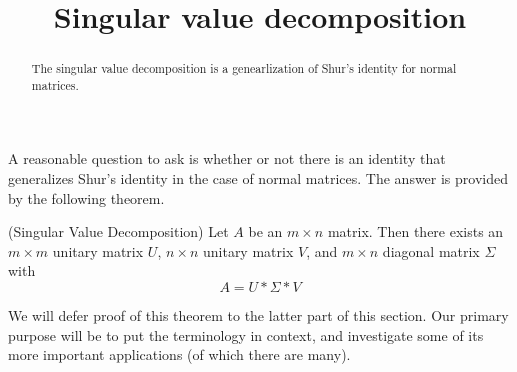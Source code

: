 \documentclass{ximera}
\title{Singular value decomposition}
\begin{document}
\begin{abstract}
  The singular value decomposition is a genearlization of Shur's
  identity for normal matrices.
\end{abstract}

A reasonable question to ask is whether or not there is an identity that generalizes Shur's identity in the case of normal matrices. The answer is provided by the following theorem.

\begin{theorem} (Singular Value Decomposition) Let $A$ be an $m\times n$ matrix. Then there exists an $m\times m$ unitary matrix $U$, $n\times n$ unitary matrix $V$, and $m\times n$ diagonal matrix $\Sigma$ with
\[
A = U*\Sigma*V
\]
\end{theorem}

We will defer proof of this theorem to the latter part of this section. Our primary purpose will be to put the terminology in context, and investigate some of its more important applications (of which there are many).
\end{document}

